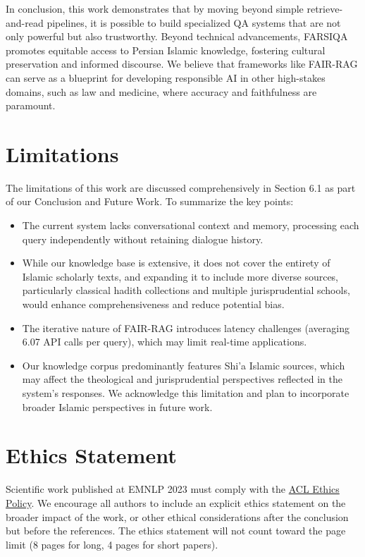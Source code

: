 \documentclass[11pt]{article}
\begin{document}
In conclusion, this work demonstrates that by moving beyond simple retrieve-and-read pipelines, it is possible to build specialized QA systems that are not only powerful but also trustworthy. Beyond technical advancements, FARSIQA promotes equitable access to Persian Islamic knowledge, fostering cultural preservation and informed discourse. We believe that frameworks like FAIR-RAG can serve as a blueprint for developing responsible AI in other high-stakes domains, such as law and medicine, where accuracy and faithfulness are paramount.

\section*{Limitations}

The limitations of this work are discussed comprehensively in Section 6.1 as part of our Conclusion and Future Work. To summarize the key points:

\begin{itemize}
    \item The current system lacks conversational context and memory, processing each query independently without retaining dialogue history.
    \item While our knowledge base is extensive, it does not cover the entirety of Islamic scholarly texts, and expanding it to include more diverse sources, particularly classical hadith collections and multiple jurisprudential schools, would enhance comprehensiveness and reduce potential bias.
    \item The iterative nature of FAIR-RAG introduces latency challenges (averaging 6.07 API calls per query), which may limit real-time applications.
    \item Our knowledge corpus predominantly features Shi'a Islamic sources, which may affect the theological and jurisprudential perspectives reflected in the system's responses. We acknowledge this limitation and plan to incorporate broader Islamic perspectives in future work.
\end{itemize}

\section*{Ethics Statement}
Scientific work published at EMNLP 2023 must comply with the \href{https://www.aclweb.org/portal/content/acl-code-ethics}{ACL Ethics Policy}. We encourage all authors to include an explicit ethics statement on the broader impact of the work, or other ethical considerations after the conclusion but before the references. The ethics statement will not count toward the page limit (8 pages for long, 4 pages for short papers).
\end{document}
